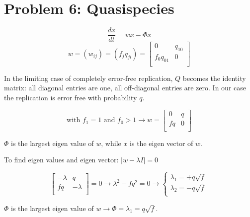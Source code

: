 \setcounter{chapter}{6}
\setcounter{section}{0}
\section{Problem 6: Quasispecies}

\[ \frac{dx}{dt} = wx - \varPhi x \] 
\[ w = (w_{ij}) = (f_{j}q_{ji}) = \begin{bmatrix}
       0 & q_{10}\\[0.3em]
       f_0q_{01} & 0 \\[0.3em]
     \end{bmatrix} \] 
     
In the limiting case of completely error-free replication, $Q$ becomes the identity matrix: all diagonal entries are one, all off-diagonal entries are zero. In our case the replication is error free with probability $q$.


\[ \text{with } f_1 = 1 \text{ and } f_0 > 1 \rightarrow w = \begin{bmatrix}
       0 & q\\[0.3em]
       fq & 0 \\[0.3em]
     \end{bmatrix} \] 
 
$\varPhi$ is the largest eigen value of $w$, while $x$ is the eigen vector of $w$.

To find eigen values and eigen vector: $ |w - \lambda I | = 0 $ 

\[ \begin{bmatrix}
       -\lambda & q\\[0.3em]
       fq & -\lambda \\[0.3em]
     \end{bmatrix} = 0 \rightarrow \lambda^2 - fq^2 = 0 \rightarrow \left\{ \begin{array}{l}
         \lambda_1 = +q\sqrt{f}\\
         \lambda_2 = -q\sqrt{f}\\
       \end{array} \right. \] 

$\varPhi$ is the largest eigen value of $w \rightarrow \varPhi = \lambda_1 = q\sqrt{f}.$

